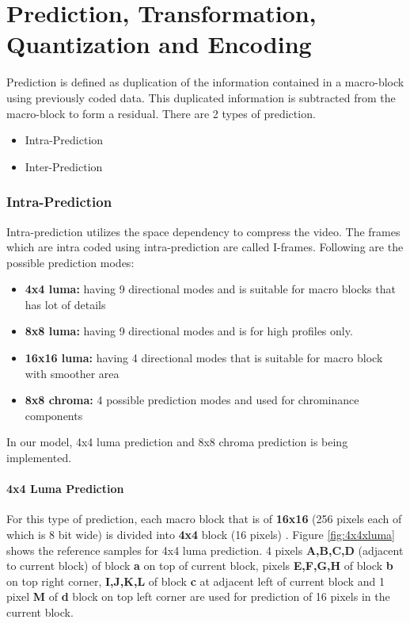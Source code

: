 
\chapter{Prediction, Transformation, Quantization and Encoding} %
\label{Chapter3}

Prediction is defined as duplication of the information contained in a macro-block using previously coded data. This duplicated information is subtracted from the macro-block to form a residual. There are 2 types of prediction.

\begin{itemize}
	\item Intra-Prediction
	\item Inter-Prediction
\end{itemize}

\subsection{Intra-Prediction}
Intra-prediction utilizes the space dependency to compress the video. The frames which are intra coded using intra-prediction are called I-frames. Following are the possible prediction modes:
\begin{itemize}
	\item \textbf{4x4 luma:} having 9 directional modes and is suitable for macro blocks that has lot of details
	\item \textbf{8x8 luma:} having 9 directional modes and is for high profiles only.
	\item \textbf{16x16 luma:} having 4 directional modes that is suitable for macro block with smoother area
	\item \textbf{8x8 chroma:} 4 possible prediction modes and used for chrominance components
\end{itemize}
In our model, 4x4 luma prediction and 8x8 chroma prediction is being implemented.

\subsubsection{4x4 Luma Prediction}
For this type of prediction, each macro block that is of \textbf{16x16} (256 pixels each of which is 8 bit wide) is divided into \textbf{4x4} block (16 pixels) \cite{anilkumar2021intra}. Figure \ref{fig:4x4xluma} shows the reference samples for 4x4 luma prediction. 4 pixels \textbf{A,B,C,D} (adjacent to current block) of block \textbf{a}  on top of current block, pixels \textbf{E,F,G,H} of block \textbf{b} on top right corner, \textbf{I,J,K,L} of block \textbf{c} at adjacent left of current block and 1 pixel \textbf{M} of \textbf{d} block on top left corner are used for prediction of 16 pixels in the current block.

